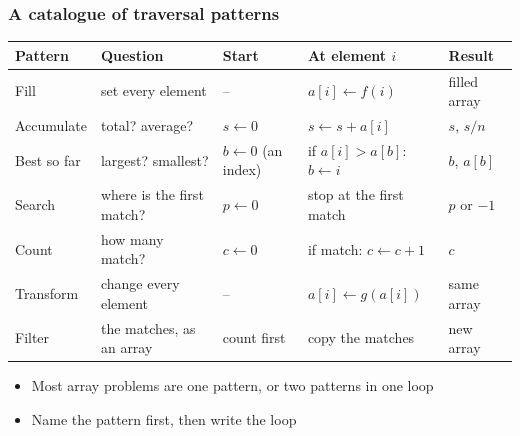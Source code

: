 \documentclass[aspectratio=169,10pt,compress]{beamer}
\begin{document}
\begin{frame}[t,fragile] \frametitle{A catalogue of traversal patterns}


\begin{table}
		\footnotesize
		\begin{tabular}{@{}L{0.12\textwidth}L{0.21\textwidth}L{0.13\textwidth}L{0.23\textwidth}L{0.12\textwidth}@{}}
			\toprule
			\textbf{Pattern} & \textbf{Question} & \textbf{Start} & \textbf{At element $i$} & \textbf{Result} \\
			\midrule
			Fill        & set every element         & --                      & $a[i] \gets f(i)$                         & filled array \\
			Accumulate  & total? average?           & $s \gets 0$             & $s \gets s + a[i]$                        & $s$, $s / n$ \\
			Best so far & largest? smallest?        & $b \gets 0$ (an index)  & if $a[i] > a[b]$: $b \gets i$             & $b$, $a[b]$ \\
			Search      & where is the first match? & $p \gets 0$             & stop at the first match                   & $p$ or $-1$ \\
			Count       & how many match?           & $c \gets 0$             & if match: $c \gets c + 1$                 & $c$ \\
			Transform   & change every element      & --                      & $a[i] \gets g(a[i])$                      & same array \\
			Filter      & the matches, as an array  & count first             & copy the matches                          & new array \\
			\bottomrule
		\end{tabular}
\end{table}%


	\vspace{0.3em}
	\begin{itemize}\small
		\item Most array problems are one pattern, or two patterns in one loop
		\item Name the pattern first, then write the loop
	\end{itemize}
\end{frame}
\end{document}
